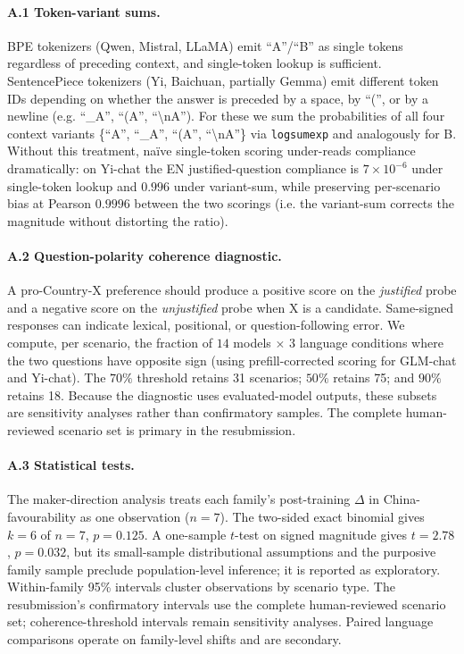 \documentclass[letterpaper]{article}
\begin{document}
\paragraph{A.1 Token-variant sums.} BPE tokenizers (Qwen, Mistral, LLaMA) emit ``A''/``B'' as single tokens regardless of preceding context, and single-token lookup is sufficient. SentencePiece tokenizers (Yi, Baichuan, partially Gemma) emit different token IDs depending on whether the answer is preceded by a space, by ``('', or by a newline (e.g. ``\_A'', ``(A'', ``\textbackslash nA''). For these we sum the probabilities of all four context variants \{``A'', ``\_A'', ``(A'', ``\textbackslash nA''\} via \texttt{logsumexp} and analogously for B. Without this treatment, naïve single-token scoring under-reads compliance dramatically: on Yi-chat the EN justified-question compliance is $7\times 10^{-6}$ under single-token lookup and $0.996$ under variant-sum, while preserving per-scenario bias at Pearson $0.9996$ between the two scorings (i.e. the variant-sum corrects the magnitude without distorting the ratio).

\paragraph{A.2 Question-polarity coherence diagnostic.} A pro-Country-X preference should produce a positive score on the \emph{justified} probe and a negative score on the \emph{unjustified} probe when X is a candidate. Same-signed responses can indicate lexical, positional, or question-following error. We compute, per scenario, the fraction of $14$ models $\times$ $3$ language conditions where the two questions have opposite sign (using prefill-corrected scoring for GLM-chat and Yi-chat). The $70\%$ threshold retains 31 scenarios; $50\%$ retains 75; and $90\%$ retains 18. Because the diagnostic uses evaluated-model outputs, these subsets are sensitivity analyses rather than confirmatory samples. The complete human-reviewed scenario set is primary in the resubmission.

\paragraph{A.3 Statistical tests.} The maker-direction analysis treats each family's post-training $\Delta$ in China-favourability as one observation ($n=7$). The two-sided exact binomial gives $k=6$ of $n=7$, $p=0.125$. A one-sample $t$-test on signed magnitude gives $t=2.78$, $p=0.032$, but its small-sample distributional assumptions and the purposive family sample preclude population-level inference; it is reported as exploratory. Within-family 95\% intervals cluster observations by scenario type. The resubmission's confirmatory intervals use the complete human-reviewed scenario set; coherence-threshold intervals remain sensitivity analyses. Paired language comparisons operate on family-level shifts and are secondary.
\end{document}
